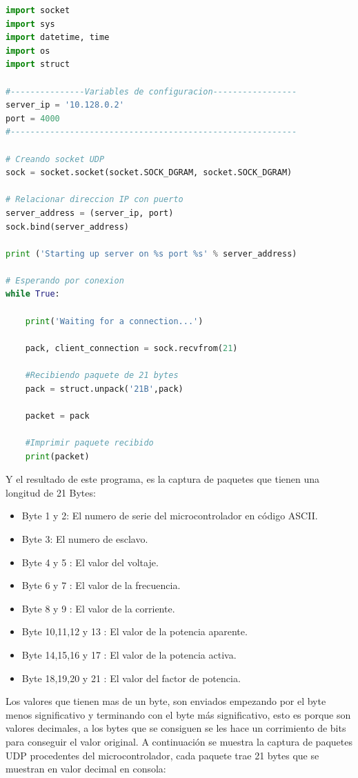 \begin{lstlisting}[language=Python]
import socket
import sys
import datetime, time
import os
import struct

#---------------Variables de configuracion-----------------
server_ip = '10.128.0.2'
port = 4000
#----------------------------------------------------------

# Creando socket UDP
sock = socket.socket(socket.SOCK_DGRAM, socket.SOCK_DGRAM)

# Relacionar direccion IP con puerto
server_address = (server_ip, port)
sock.bind(server_address)

print ('Starting up server on %s port %s' % server_address)

# Esperando por conexion
while True:

    print('Waiting for a connection...')
    
    pack, client_connection = sock.recvfrom(21)

    #Recibiendo paquete de 21 bytes
    pack = struct.unpack('21B',pack)

    packet = pack

    #Imprimir paquete recibido
    print(packet)

\end{lstlisting}

Y el resultado de este programa, es la captura de paquetes que tienen una longitud de 21 Bytes:
\begin{itemize}
    \item Byte 1 y 2: El numero de serie del microcontrolador en código ASCII.
    \item Byte 3: El numero de esclavo.
    \item Byte 4 y 5 : El valor del voltaje.
    \item Byte 6 y 7 : El valor de la frecuencia.
    \item Byte 8 y 9 : El valor de la corriente.
    \item Byte 10,11,12 y 13 : El valor de la potencia aparente.
    \item Byte 14,15,16 y 17 : El valor de la potencia activa.
    \item Byte 18,19,20 y 21 : El valor del factor de potencia.
\end{itemize}

Los valores que tienen mas de un byte, son enviados empezando por el byte menos significativo y terminando con el byte más significativo, esto es porque son valores decimales, a los bytes que se consiguen se les hace un corrimiento de bits para conseguir el valor original.
A continuación se muestra la captura de paquetes UDP procedentes del microcontrolador, cada paquete trae 21 bytes que se muestran en valor decimal en consola:

